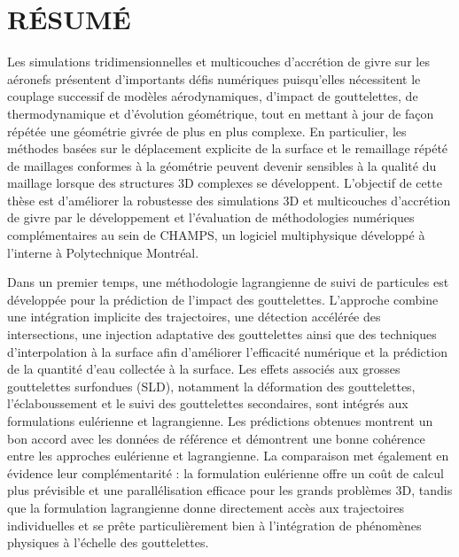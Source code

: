 %
\chapter*{RÉSUMÉ}\thispagestyle{headings}

Les simulations tridimensionnelles et multicouches d’accrétion de givre sur les aéronefs présentent d’importants défis numériques puisqu’elles nécessitent le couplage successif de modèles aérodynamiques, d’impact de gouttelettes, de thermodynamique et d’évolution géométrique, tout en mettant à jour de façon répétée une géométrie givrée de plus en plus complexe. En particulier, les méthodes basées sur le déplacement explicite de la surface et le remaillage répété de maillages conformes à la géométrie peuvent devenir sensibles à la qualité du maillage lorsque des structures 3D complexes se développent. L'objectif de cette thèse est d'améliorer la robustesse des simulations 3D et multicouches d'accrétion de givre par le développement et l'évaluation de méthodologies numériques complémentaires au sein de \textsc{CHAMPS}, un logiciel multiphysique développé à l’interne à Polytechnique Montréal.

Dans un premier temps, une méthodologie lagrangienne de suivi de particules est développée pour la prédiction de l'impact des gouttelettes. L'approche combine une intégration implicite des trajectoires, une détection accélérée des intersections, une injection adaptative des gouttelettes ainsi que des techniques d'interpolation à la surface afin d'améliorer l'efficacité numérique et la prédiction de la quantité d'eau collectée à la surface. Les effets associés aux grosses gouttelettes surfondues (SLD), notamment la déformation des gouttelettes, l'éclaboussement et le suivi des gouttelettes secondaires, sont intégrés aux formulations eulérienne et lagrangienne. Les prédictions obtenues montrent un bon accord avec les données de référence et démontrent une bonne cohérence entre les approches eulérienne et lagrangienne. La comparaison met également en évidence leur complémentarité : la formulation eulérienne offre un coût de calcul plus prévisible et une parallélisation efficace pour les grands problèmes 3D, tandis que la formulation lagrangienne donne directement accès aux trajectoires individuelles et se prête particulièrement bien à l'intégration de phénomènes physiques à l'échelle des gouttelettes.

